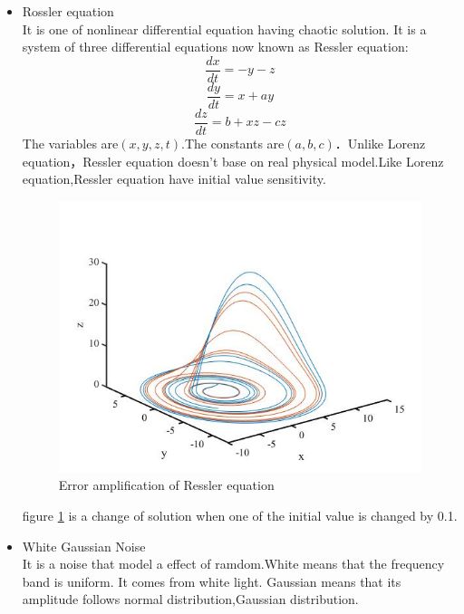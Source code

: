 \documentclass[autodetect-engine,dvipdfmx-if-dvi,ja=standard,a4paper,11pt]{bxjsarticle} %
\begin{document}
\begin{itemize}
figure \ref{fig:lorenz} is a change of solution when one of the initial value is changed by 0.1. \\

\item Rossler equation\\%
It is one of nonlinear differential equation having chaotic solution. It is a system of three differential equations now known as Ressler equation:\cite{re}
\begin{equation}
\frac{dx}{dt}=-y-z
\end{equation}
\begin{equation}
\frac{dy}{dt}=x+ay
\end{equation}
\begin{equation}
\frac{dz}{dt}=b+xz-cz
\end{equation}
The variables are$(x,y,z,t)$.The constants are$(a,b,c)$．Unlike Lorenz equation，Ressler equation doesn't base on real physical model.Like Lorenz equation,Ressler equation have initial value sensitivity.

\begin{figure}[H]%
\begin{center}
\includegraphics[width=.4\textwidth]{Rossler_result.jpg}
\end{center}
\caption{Error amplification of Ressler equation}%
\label{fig:rossler}
\end{figure}

figure \ref{fig:rossler} is a change of solution when one of the initial value is changed by 0.1.\\


\item White Gaussian Noise\\%
It is a noise that model a effect of ramdom.White means that the frequency band is uniform. It comes from white light. Gaussian means that its amplitude follows normal distribution,Gaussian distribution.    


\end{itemize}
\end{document}

